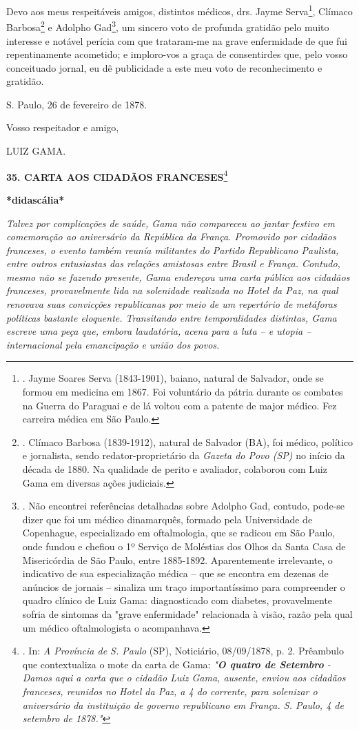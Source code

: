 Devo aos meus respeitáveis amigos, distintos médicos, drs. Jayme
Serva\footnote{. Jayme Soares Serva (1843-1901), baiano, natural de
  Salvador, onde se formou em medicina em 1867. Foi voluntário da pátria
  durante os combates na Guerra do Paraguai e de lá voltou com a patente
  de major médico. Fez carreira médica em São Paulo.}, Clímaco
Barbosa\footnote{. Clímaco Barbosa (1839-1912), natural de Salvador
  (BA), foi médico, político e jornalista, sendo redator-proprietário da
  \emph{Gazeta do Povo (SP)} no início da década de 1880. Na qualidade
  de perito e avaliador, colaborou com Luiz Gama em diversas ações
  judiciais.} e Adolpho Gad\footnote{. Não encontrei referências
  detalhadas sobre Adolpho Gad, contudo, pode-se dizer que foi um médico
  dinamarquês, formado pela Universidade de Copenhague, especializado em
  oftalmologia, que se radicou em São Paulo, onde fundou e chefiou o 1º
  Serviço de Moléstias dos Olhos da Santa Casa de Misericórdia de São
  Paulo, entre 1885-1892. Aparentemente irrelevante, o indicativo de sua
  especialização médica -- que se encontra em dezenas de anúncios de
  jornais -- sinaliza um traço importantíssimo para compreender o quadro
  clínico de Luiz Gama: diagnosticado com diabetes, provavelmente sofria
  de sintomas da "grave enfermidade" relacionada à visão, razão pela
  qual um médico oftalmologista o acompanhava.},
u\protect\hypertarget{Secao_Sem_Titulo-47}{}{}m sincero voto de profunda
gratidão pelo muito interesse e notável perícia com que trataram-me na
grave enfermidade de que fui repentinamente acometido; e imploro-vos a
graça de consentirdes que, pelo vosso conceituado jornal, eu dê
publicidade a este meu voto de reconhecimento e gratidão.

S. Paulo, 26 de fevereiro de 1878.

Vosso respeitador e amigo,

LUIZ GAMA.

\textbf{35. CARTA AOS CIDADÃOS FRANCESES}\footnote{. In: \emph{A
  Província de S. Paulo} (SP), Noticiário, 08/09/1878, p. 2. Prêambulo
  que contextualiza o mote da carta de Gama: \emph{"\textbf{O quatro de
  Setembro} - Damos aqui a carta que o cidadão Luiz Gama, ausente,
  enviou aos cidadãos franceses, reunidos no Hotel da Paz, a 4 do
  corrente, para solenizar o aniversário da instituição de governo
  republicano em França. S. Paulo, 4 de setembro de 1878."}}

\textbf{*didascália*}

\emph{Talvez por complicações de saúde, Gama não compareceu ao jantar
festivo em comemoração ao aniversário da República da França. Promovido
por cidadãos franceses, o evento também reunía militantes do Partido
Republicano Paulista, entre outros entusiastas das relações amistosas
entre Brasil e França. Contudo, mesmo não se fazendo presente, Gama
endereçou uma carta pública aos cidadãos franceses, provavelmente lida
na solenidade realizada no Hotel da Paz, na qual renovava suas
convicções republicanas por meio de um repertório de metáforas políticas
bastante eloquente. Transitando entre temporalidades distintas, Gama
escreve uma peça que, embora laudatória, acena para a luta -- e utopia
-- internacional pela emancipação e união dos povos.}

